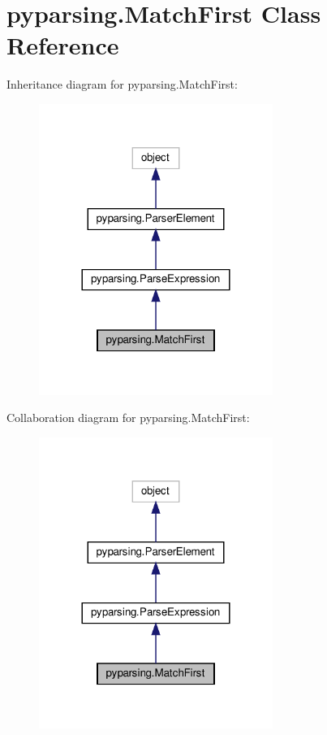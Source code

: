 \hypertarget{classpyparsing_1_1MatchFirst}{}\section{pyparsing.\+Match\+First Class Reference}
\label{classpyparsing_1_1MatchFirst}


Inheritance diagram for pyparsing.\+Match\+First\+:
\nopagebreak
\begin{figure}[H]
\begin{center}
\leavevmode
\includegraphics[width=216pt]{classpyparsing_1_1MatchFirst__inherit__graph}
\end{center}
\end{figure}


Collaboration diagram for pyparsing.\+Match\+First\+:
\nopagebreak
\begin{figure}[H]
\begin{center}
\leavevmode
\includegraphics[width=216pt]{classpyparsing_1_1MatchFirst__coll__graph}
\end{center}
\end{figure}
